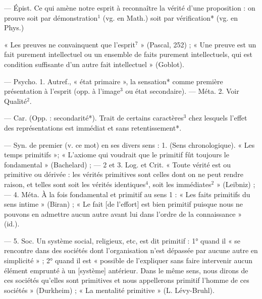 \begin{itemize}[leftmargin=1cm, label=, itemsep=1pt]
 — Épist. Ce qui amène notre
esprit à reconnaître la vérité d’une
proposition : on prouve soit par
démonstration$^1$ (vg. en Math.) soit
par vérification* (vg. en Phys.)

« Les preuves ne convainquent que
l'esprit$^7$ » (Pascal, 252) ; « Une
preuve est un fait purement intellectuel ou un ensemble de faits purement
intellectuels, qui est condition suffisante d’un autre fait intellectuel » (Goblot).

 — Psycho. 1. Autref., « état
primaire », la sensation* comme première présentation à l'esprit (opp. à
l’image$^3$ ou état secondaire). —
Méta. 2. Voir Qualité$^2$.

 — Car. (Opp. : secondarité*).
Trait de certains caractères$^3$ chez
lesquels l'effet des représentations
est immédiat et sans retentissement*.

 — Syn. de premier (v. ce
mot) en ses divers sens : 1. (Sens
chronologique). « Les temps primitifs »; « L’axiome qui voudrait
que le primitif fût toujours le fondamental » (Bachelard) ; — 2 et 3. Log.
et Crit. « Toute vérité est ou primitive ou dérivée : les vérités primitives sont celles dont on ne peut
rendre raison, et telles sont soit les
vérités identiques$^4$, soit les immédiates$^2$ » (Leibniz) ; — 4. Méta. À la
fois fondamental et primitif au
sens 1 : « Les faits primitifs du sens
intime » (Biran) ; « Le fait [de
l'effort] est bien primitif puisque
nous ne pouvons en admettre aucun
autre avant lui dans l’ordre de la
connaissance » (id.).

— 5. Soc. Un système social,
religieux, etc, est dit primitif :
1° quand il « se rencontre dans des
sociétés dont l’organisation n'est
dépassée par aucune autre en simplicité » ; 2° quand il est « possible
de l'expliquer sans faire intervenir
aucun élément emprunté à un [système] antérieur. Dans le même sens,
nous dirons de ces sociétés qu’elles
sont primitives et nous appellerons
primitif l'homme de ces sociétés »
(Durkheim) ; « La mentalité primitive » (L. Lévy-Bruhl).


\end{itemize}
